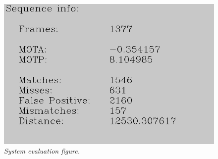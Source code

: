 \begin{figure}[htb]
	\centering
	\includegraphics[width=\linewidth]{images/sequenceEvaluation}
	\caption{\textit{System evaluation figure.}}
	\label{fig:system_evaluation_fig} %
\end{figure}



